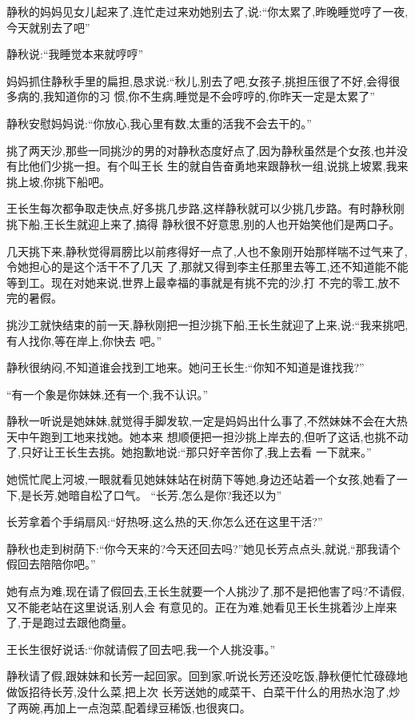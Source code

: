 ﻿\documentclass[12pt]{article}
\begin{document}
静秋的妈妈见女儿起来了,连忙走过来劝她别去了,说:``你太累了,昨晚睡觉哼了一夜,今天就别去了吧\myrule ''

静秋说:``我睡觉本来就哼哼\myrule ''

妈妈抓住静秋手里的扁担,恳求说:``秋儿,别去了吧,女孩子,挑担压很了不好,会得很多病的\myrule ,我知道你的习
惯,你不生病,睡觉是不会哼哼的,你昨天一定是太累了\myrule ''

静秋安慰妈妈说:``你放心,我心里有数,太重的活我不会去干的。''

挑了两天沙,那些一同挑沙的男的对静秋态度好点了,因为静秋虽然是个女孩,也并没有比他们少挑一担。有个叫王长
生的就自告奋勇地来跟静秋一组,说挑上坡累,我来挑上坡,你挑下船吧。

王长生每次都争取走快点,好多挑几步路,这样静秋就可以少挑几步路。有时静秋刚挑下船,王长生就迎上来了,搞得
静秋很不好意思,别的人也开始笑他们是两口子。

几天挑下来,静秋觉得肩膀比以前疼得好一点了,人也不象刚开始那样喘不过气来了,令她担心的是这个活干不了几天
了,那就又得到李主任那里去等工,还不知道能不能等到工。现在对她来说,世界上最幸福的事就是有挑不完的沙,打
不完的零工,放不完的暑假。

挑沙工就快结束的前一天,静秋刚把一担沙挑下船,王长生就迎了上来,说:``我来挑吧,有人找你,等在岸上,你快去
吧。''

静秋很纳闷,不知道谁会找到工地来。她问王长生:``你\myrule 知不知道是谁找我?''

``有一个象是你妹妹,还有一个\myrule ,我不认识。''

静秋一听说是她妹妹,就觉得手脚发软,一定是妈妈出什么事了,不然妹妹不会在大热天中午跑到工地来找她。她本来
想顺便把一担沙挑上岸去的,但听了这话,也挑不动了,只好让王长生去挑。她抱歉地说:``那只好辛苦你了,我上去看
一下就来。''

她慌忙爬上河坡,一眼就看见她妹妹站在树荫下等她,身边还站着一个女孩,她看了一下,是长芳,她暗自松了口气。
``长芳,怎么是你?我还以为\myrule ''

长芳拿着个手绢扇风:``好热呀,这么热的天,你怎么还在这里干活?''

静秋也走到树荫下:``你\myrule 今天来的?今天还回去吗?''她见长芳点点头,就说,``那我请个假回去陪陪你吧。''

她有点为难,现在请了假回去,王长生就要一个人挑沙了,那不是把他害了吗?不请假,又不能老站在这里说话,别人会
有意见的。正在为难,她看见王长生挑着沙上岸来了,于是跑过去跟他商量。

王长生很好说话:``你就请假了回去吧,我一个人挑没事。''

静秋请了假,跟妹妹和长芳一起回家。回到家,听说长芳还没吃饭,静秋便忙忙碌碌地做饭招待长芳,没什么菜,把上次
长芳送她的咸菜干、白菜干什么的用热水泡了,炒了两碗,再加上一点泡菜,配着绿豆稀饭,也很爽口。
\end{document}
